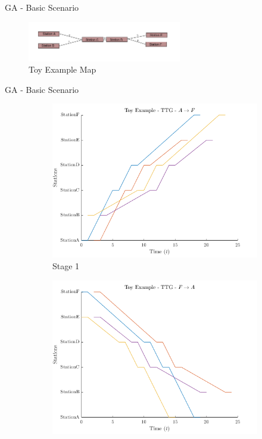 \documentclass[aspectratio=169]{beamer}
\begin{document}
\begin{frame}{GA - Basic Scenario}
    \begin{figure}
        \centering
        \includegraphics[width=0.60\textwidth]{assets/GA/basicExampleChartCropped.png}
        \caption{Toy Example Map}
        \label{fig:ga-toy}
    \end{figure}
\end{frame}

\begin{frame}{GA - Basic Scenario}
    \begin{figure}
        \centering
        \begin{subfigure}[t]{0.3\textwidth}
            \centering
            \includegraphics[width=\linewidth]{assets/GA/toy1.png}
            \caption{Stage 1}
            \label{fig:ga-stage1}
        \end{subfigure}
        \begin{subfigure}[t]{0.3\textwidth}
            \centering
            \includegraphics[width=\linewidth]{assets/GA/toy2.png}

\end{subfigure}
\end{figure}
\end{frame}
\end{document}
